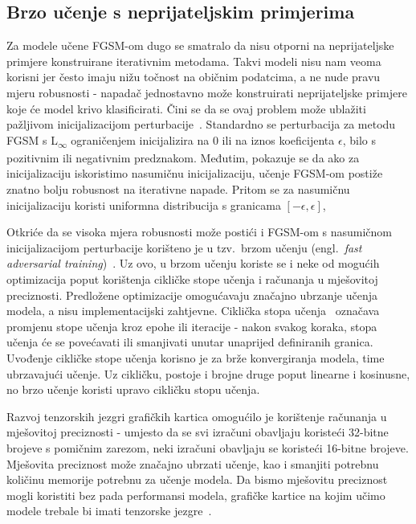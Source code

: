 \documentclass[times, utf8, zavrsni, numeric]{fer}
\begin{document}
\subsection{Brzo učenje s neprijateljskim primjerima}

Za modele učene FGSM-om dugo se smatralo da nisu otporni na neprijateljske primjere konstruirane iterativnim metodama.
Takvi modeli nisu nam veoma korisni jer često imaju nižu točnost na običnim podatcima, a ne nude pravu mjeru robusnosti - napadač jednostavno može konstruirati neprijateljske primjere koje će model krivo klasificirati.
Čini se da se ovaj problem može ublažiti pažljivom inicijalizacijom perturbacije~\cite{wong2020fast}.
Standardno se perturbacija za metodu FGSM s L\textsubscript{$\infty$} ograničenjem inicijalizira na 0 ili na iznos koeficijenta $\epsilon$, bilo s pozitivnim ili negativnim predznakom.
Međutim, pokazuje se da ako za inicijalizaciju iskoristimo nasumičnu inicijalizaciju, učenje FGSM-om postiže znatno bolju robusnost na iterativne napade.
Pritom se za nasumičnu inicijalizaciju koristi uniformna distribucija s granicama $[-\epsilon, \epsilon]$,

Otkriće da se visoka mjera robusnosti može postići i FGSM-om s nasumičnom inicijalizacijom perturbacije korišteno je u tzv.\ brzom učenju (engl.\ \textit{fast adversarial training})~\cite{wong2020fast}.
Uz ovo, u brzom učenju koriste se i neke od mogućih optimizacija poput korištenja cikličke stope učenja i računanja u mješovitoj preciznosti.
Predložene optimizacije omogućavaju značajno ubrzanje učenja modela, a nisu implementacijski zahtjevne.
Ciklička stopa učenja~\cite{smith2017cyclical} označava promjenu stope učenja kroz epohe ili iteracije - nakon svakog koraka, stopa učenja će se povećavati ili smanjivati unutar unaprijed definiranih granica.
Uvođenje cikličke stope učenja korisno je za brže konvergiranja modela, time ubrzavajući učenje. 
Uz cikličku, postoje i brojne druge poput linearne i kosinusne, no brzo učenje koristi upravo cikličku stopu učenja.

Razvoj tenzorskih jezgri grafičkih kartica omogućilo je korištenje računanja u mješovitoj preciznosti - 
umjesto da se svi izračuni obavljaju koristeći 32-bitne brojeve s pomičnim zarezom, neki izračuni obavljaju se koristeći 16-bitne brojeve.
Mješovita preciznost može značajno ubrzati učenje, kao i smanjiti potrebnu količinu memorije potrebnu za učenje modela.
Da bismo mješovitu preciznost mogli koristiti bez pada performansi modela, grafičke kartice na kojim učimo modele trebale bi imati tenzorske jezgre~\cite{micikevicius2017mixed}.
\end{document}
